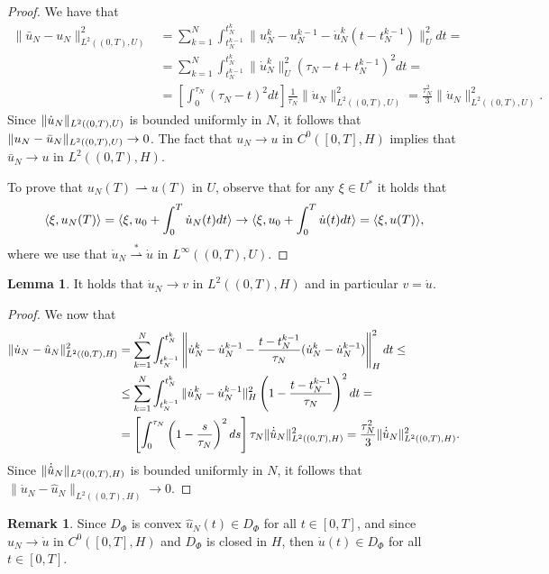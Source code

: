 \documentclass[a4paper,10pt,twoside]{amsbook}
\numberwithin{section}{chapter}
\numberwithin{equation}{chapter}
\theoremstyle{definition}
\newtheorem{lemma}[prop]{Lemma}
\newtheorem{rmk}[prop]{Remark}
\DeclarePairedDelimiter{\norm}{\lVert}{\rVert}
\DeclarePairedDelimiter{\dual}{\langle}{\rangle}
\begin{document}
\begin{proof}
We have that
\[
\begin{split}
\|\bar{u}_N-u_N\|_{L^2((0,T),U)}^2&=\sum_{k=1}^N\int_{t_N^{k-1}}^{t_N^k}\|u_N^k-u_N^{k-1}-\dot{u}_N^k(t-t_N^{k-1})\|_U^2dt=\\
&=\sum_{k=1}^N\int_{t_N^{k-1}}^{t_N^k}\|\dot{u}_N^k\|_U^2\left(\tau_N-t+t_N^{k-1}\right)^2dt=\\
&=\left[\int_0^{\tau_N}(\tau_N-t)^2dt\right]\frac{1}{\tau_N}\|\dot{u}_N\|_{L^2((0,T),U)}^2=\frac{\tau_N^2}{3}\|\dot{u}_N\|_{L^2((0,T),U)}^2.
\end{split}
\]
Since $\norm{\dot u_N}_{L^2((0,T),U)}$ is bounded uniformly in $N$, it follows that $\norm{u_N-\bar u_N}_{L^2((0,T),U)}\to0$. The fact that $u_N\to u$ in $C^0([0,T],H)$ implies that $\bar u_N\to u$ in $L^2((0,T),H)$.

To prove that $u_N(T)\rightharpoonup u(T)$ in $U$, observe that for any $\xi\in U^*$ it holds that
\[
\langle\xi,u_N(T)\rangle=\langle\xi,u_0+\int_0^T\dot{u}_N(t)dt\rangle\to\langle\xi,u_0+\int_0^T\dot{u}(t)dt\rangle=\dual{\xi,u(T)},
\]
where we use that $\dot u_N\overset{*}{\rightharpoonup}\dot u$ in $L^\infty((0,T),U)$.
\end{proof}
\begin{lemma}
It holds that $\dot u_N\to v$ in $L^2((0,T),H)$ and in particular $v=\dot u$.
\end{lemma}
\begin{proof}
We now that
\[
\begin{split}
\|\dot{u}_N-\hat{u}_N\|_{L^2((0,T),H)}^2&=\sum_{k=1}^N\int_{t_N^{k-1}}^{t_N^k}\left\|\dot{u}_N^k-\dot{u}_N^{k-1}-\frac{t-t_N^{k-1}}{\tau_N}(\dot{u}_N^k-\dot{u}_N^{k-1})\right\|_H^2dt\le\\
&\le\sum_{k=1}^N\int_{t_N^{k-1}}^{t_N^k}\|\dot{u}_N^k-\dot{u}_N^{k-1}\|_H^2\left(1-\frac{t-t_N^{k-1}}{\tau_N}\right)^2dt=\\
&=\left[\int_0^{\tau_N}\left(1-\frac{s}{\tau_N}\right)^2ds\right]\tau_N\norm{\dot{\hat{u}}_N}_{L^2((0,T),H)}^2=\frac{\tau_N^2}{3}\norm{\dot{\hat{u}}_N}_{L^2((0,T),H)}^2.
\end{split}
\]
Since $\norm{\dot{\hat{u}}_N}_{L^2((0,T),H)}$ is bounded uniformly in $N$, it follows that $\|\dot{u}_N-\hat{u}_N\|_{L^2((0,T),H)}\to0$.
\end{proof}
\begin{rmk}
Since $D_\Phi$ is convex $\hat u_N(t)\in D_\Phi$ for all $t\in[0,T]$, and since $\hat u_N\to\dot u$ in $C^0([0,T],H)$ and $D_\Phi$ is closed in $H$, then $\dot u(t)\in D_\Phi$ for all $t\in[0,T]$.
\end{rmk}
\end{document}
